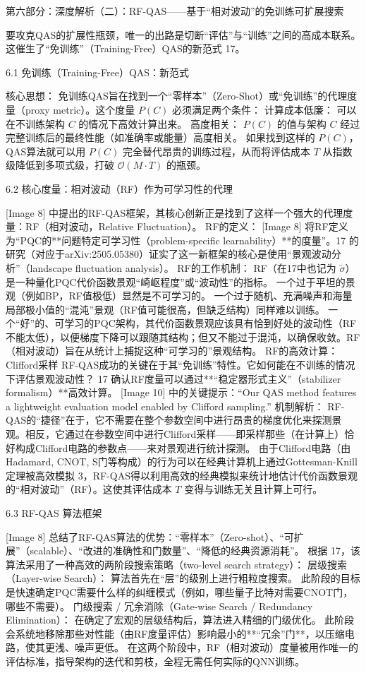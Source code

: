 \documentclass[12pt,a4paper]{article}
\begin{document}
第六部分：深度解析（二）：RF-QAS——基于“相对波动”的免训练可扩展搜索

要攻克QAS的扩展性瓶颈，唯一的出路是切断“评估”与“训练”之间的高成本联系。这催生了“免训练”（Training-Free）QAS的新范式 17。

6.1 免训练（Training-Free）QAS：新范式

核心思想：
免训练QAS旨在找到一个“零样本”（Zero-Shot）或“免训练”的代理度量（proxy metric）。这个度量 $P(C)$ 必须满足两个条件：
计算成本低廉： 可以在不训练架构 $C$ 的情况下高效计算出来。
高度相关： $P(C)$ 的值与架构 $C$ 经过完整训练后的最终性能（如准确率或能量）高度相关。
如果找到这样的 $P(C)$，QAS算法就可以用 $P(C)$ 完全替代昂贵的训练过程，从而将评估成本 $T$ 从指数级降低到多项式级，打破 $\mathcal{O}(M \cdot T)$ 的瓶颈。

6.2 核心度量：相对波动（RF）作为可学习性的代理

[Image 8] 中提出的RF-QAS框架，其核心创新正是找到了这样一个强大的代理度量：RF（相对波动，Relative Fluctuation）。
RF的定义： [Image 8] 将RF定义为“PQC的**问题特定可学习性（problem-specific learnability）**的度量”。17 的研究（对应于arXiv:2505.05380）证实了这一新框架的核心是使用“景观波动分析”（landscape fluctuation analysis）。
RF的工作机制： RF（在17中也记为 $\tilde{\sigma}$）是一种量化PQC代价函数景观“崎岖程度”或“波动性”的指标。
一个过于平坦的景观（例如BP，RF值极低）显然是不可学习的。
一个过于随机、充满噪声和海量局部极小值的“混沌”景观（RF值可能很高，但缺乏结构）同样难以训练。
一个“好”的、可学习的PQC架构，其代价函数景观应该具有恰到好处的波动性（RF不能太低），以便梯度下降可以跟随其结构；但又不能过于混沌，以确保收敛。RF（相对波动）旨在从统计上捕捉这种“可学习的”景观结构。
RF的高效计算：Clifford采样
RF-QAS成功的关键在于其“免训练”特性。它如何能在不训练的情况下评估景观波动性？
17
确认RF度量可以通过**“稳定器形式主义”（stabilizer formalism）**高效计算。
[Image 10] 中的关键提示：“Our QAS method features a lightweight evaluation model enabled by Clifford sampling.”
机制解析： RF-QAS的“捷径”在于，它不需要在整个参数空间中进行昂贵的梯度优化来探测景观。相反，它通过在参数空间中进行Clifford采样——即采样那些（在计算上）恰好构成Clifford电路的参数点——来对景观进行统计探测。
由于Clifford电路（由Hadamard, CNOT, S门等构成）的行为可以在经典计算机上通过Gottesman-Knill定理被高效模拟 3，RF-QAS得以利用高效的经典模拟来统计地估计代价函数景观的“相对波动”（RF）。这使其评估成本 $T$ 变得与训练无关且计算上可行。

6.3 RF-QAS 算法框架

[Image 8] 总结了RF-QAS算法的优势：“零样本”（Zero-shot）、“可扩展”（scalable）、“改进的准确性和门数量”、“降低的经典资源消耗”。
根据 17，该算法采用了一种高效的两阶段搜索策略（two-level search strategy）：
层级搜索（Layer-wise Search）：
算法首先在“层”的级别上进行粗粒度搜索。
此阶段的目标是快速确定PQC需要什么样的纠缠模式（例如，哪些量子比特对需要CNOT门，哪些不需要）。
门级搜索 / 冗余消除（Gate-wise Search / Redundancy Elimination）：
在确定了宏观的层级结构后，算法进入精细的门级优化。
此阶段会系统地移除那些对性能（由RF度量评估）影响最小的**“冗余”门**，以压缩电路，使其更浅、噪声更低。
在这两个阶段中，RF（相对波动）度量被用作唯一的评估标准，指导架构的迭代和剪枝，全程无需任何实际的QNN训练。
\end{document}
